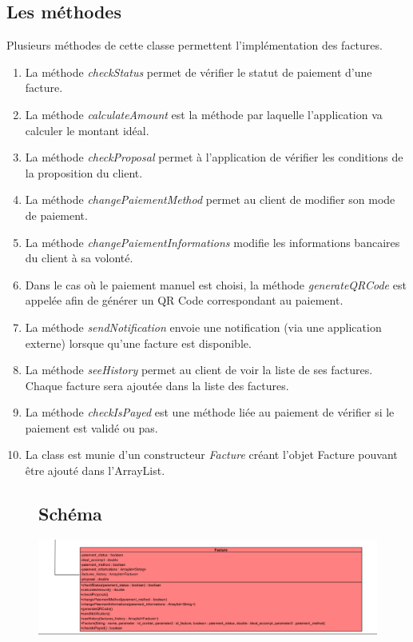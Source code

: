 \newpage
\subsection{Les méthodes}
\begin{flushleft}
Plusieurs méthodes de cette classe permettent l'implémentation des factures.
\end{flushleft}

\begin{enumerate}[-]

\item La méthode \emph{checkStatus} permet de vérifier le statut de paiement d'une facture.

\item La méthode \emph{calculateAmount} est la méthode par laquelle l'application va calculer le montant idéal.

\item La méthode \emph{checkProposal} permet à l'application de vérifier les conditions de la proposition du client.

\item La méthode \emph{changePaiementMethod} permet au client de modifier son mode de paiement.

\item La méthode \emph{changePaiementInformations} modifie les informations bancaires du client à sa volonté.

\item Dans le cas où le paiement manuel est choisi, la méthode \emph{generateQRCode} est appelée afin de générer un QR Code correspondant au paiement.

\item La méthode \emph{sendNotification} envoie une notification (via une application externe) lorsque qu'une facture est disponible.

\item La méthode \emph{seeHistory} permet au client de voir la liste de ses factures. Chaque facture sera ajoutée dans la liste des factures.

\item La méthode \emph{checkIsPayed} est une méthode liée au paiement de vérifier si le paiement est validé ou pas.

\item La class est munie d'un constructeur \emph{Facture} créant l'objet Facture pouvant être ajouté dans l'ArrayList.

\end{enumerate}

\newpage
\begin{figure}[h]
\subsection{Schéma}
\centering
\includegraphics[width = 1.3\textwidth]{extension-maxime/class/img/class-extension.png}
\end{figure}


